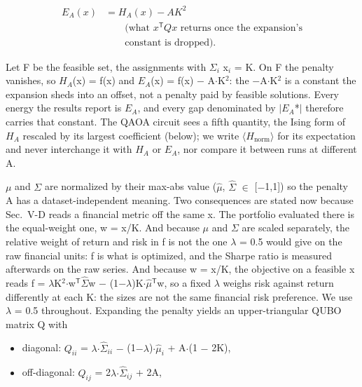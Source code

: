 \documentclass{ieeeaccess}
\begin{document}
\begin{equation*}
\begin{aligned} E_A(x) &= H_A(x) - A K^2 \\ &\qquad\text{(what $x^{\mathsf{T}}Qx$ returns once the expansion's}\\ &\qquad\text{constant is dropped).}\end{aligned}
\end{equation*}


Let F be the feasible set, the assignments with $\Sigma$$_i$ x$_i$ = K. On F the penalty vanishes, so $H_{A}$(x) = f(x) and $E_{A}$(x) = f(x) $-$ A$\cdot$K$^{2}$: the $-$A$\cdot$K$^{2}$ is a constant the expansion sheds into an offset, not a penalty paid by feasible solutions. Every energy the results report is $E_{A}$, and every gap denominated by $|$$E_{A}$*$|$ therefore carries that constant. The QAOA circuit sees a fifth quantity, the Ising form of $H_{A}$ rescaled by its largest coefficient (below); we write $\langle$$H_{\mathrm{norm}}$$\rangle$ for its expectation and never interchange it with $H_{A}$ or $E_{A}$, nor compare it between runs at different A.


$\mu$ and $\Sigma$ are normalized by their max-abs value ($\hat{\mu}$, $\hat{\Sigma}$ $\in$ [$-$1,1]) so the penalty A has a dataset-independent meaning. Two consequences are stated now because Sec.~V-D reads a financial metric off the same x. The portfolio evaluated there is the equal-weight one, w = x/K. And because $\mu$ and $\Sigma$ are scaled separately, the relative weight of return and risk in f is not the one $\lambda$ = 0.5 would give on the raw financial units: f is what is optimized, and the Sharpe ratio is measured afterwards on the raw series. And because w = x/K, the objective on a feasible x reads f = $\lambda$K$^{2}$$\cdot$w$^{\mathsf{T}}$$\hat{\Sigma}$w $-$ (1$-$$\lambda$)K$\cdot$$\hat{\mu}$$^{\mathsf{T}}$w, so a fixed $\lambda$ weighs risk against return differently at each K: the sizes are not the same financial risk preference. We use $\lambda$ = 0.5 throughout. Expanding the penalty yields an upper-triangular QUBO matrix Q with


\begin{itemize}
\item diagonal: $Q_{ii}$ = $\lambda$$\cdot$$\hat{\Sigma}_{ii}$ $-$ (1$-$$\lambda$)$\cdot$$\hat{\mu}_{i}$ + A$\cdot$(1 $-$ 2K),
\item off-diagonal: $Q_{ij}$ = 2$\lambda$$\cdot$$\hat{\Sigma}_{ij}$ + 2A,
\end{itemize}
\end{document}
